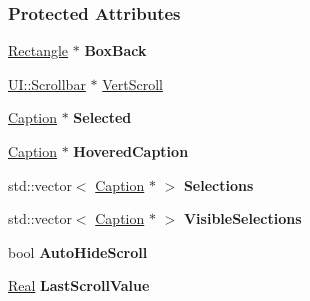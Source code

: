 \subsubsection*{Protected Attributes}
\begin{DoxyCompactItemize}
\item 
\hypertarget{classphys_1_1UI_1_1ListBox_a07de9457be75ad3b9ff21683d99d545b}{
\hyperlink{classphys_1_1UI_1_1Rectangle}{Rectangle} $\ast$ {\bfseries BoxBack}}
\label{classphys_1_1UI_1_1ListBox_a07de9457be75ad3b9ff21683d99d545b}

\item 
\hyperlink{classphys_1_1UI_1_1Scrollbar}{UI::Scrollbar} $\ast$ \hyperlink{classphys_1_1UI_1_1ListBox_ab2b012b345ff4bb1a5b228fef88d895c}{VertScroll}
\item 
\hypertarget{classphys_1_1UI_1_1ListBox_a62d0841248552db1479b8be601c3a5c3}{
\hyperlink{classphys_1_1UI_1_1Caption}{Caption} $\ast$ {\bfseries Selected}}
\label{classphys_1_1UI_1_1ListBox_a62d0841248552db1479b8be601c3a5c3}

\item 
\hypertarget{classphys_1_1UI_1_1ListBox_a963c94fef825d15befd0058c70a1d2df}{
\hyperlink{classphys_1_1UI_1_1Caption}{Caption} $\ast$ {\bfseries HoveredCaption}}
\label{classphys_1_1UI_1_1ListBox_a963c94fef825d15befd0058c70a1d2df}

\item 
\hypertarget{classphys_1_1UI_1_1ListBox_a5a514bce001102aef65c79a0e810d11b}{
std::vector$<$ \hyperlink{classphys_1_1UI_1_1Caption}{Caption} $\ast$ $>$ {\bfseries Selections}}
\label{classphys_1_1UI_1_1ListBox_a5a514bce001102aef65c79a0e810d11b}

\item 
\hypertarget{classphys_1_1UI_1_1ListBox_adb069b745918dd8ea9678a0fc199bf1c}{
std::vector$<$ \hyperlink{classphys_1_1UI_1_1Caption}{Caption} $\ast$ $>$ {\bfseries VisibleSelections}}
\label{classphys_1_1UI_1_1ListBox_adb069b745918dd8ea9678a0fc199bf1c}

\item 
\hypertarget{classphys_1_1UI_1_1ListBox_a45271c1bffa336d7c86ce9c70b83e000}{
bool {\bfseries AutoHideScroll}}
\label{classphys_1_1UI_1_1ListBox_a45271c1bffa336d7c86ce9c70b83e000}

\item 
\hypertarget{classphys_1_1UI_1_1ListBox_a8a68a1177b1a273ada009245533a808c}{
\hyperlink{namespacephys_af7eb897198d265b8e868f45240230d5f}{Real} {\bfseries LastScrollValue}}
\label{classphys_1_1UI_1_1ListBox_a8a68a1177b1a273ada009245533a808c}


\end{DoxyCompactItemize}
